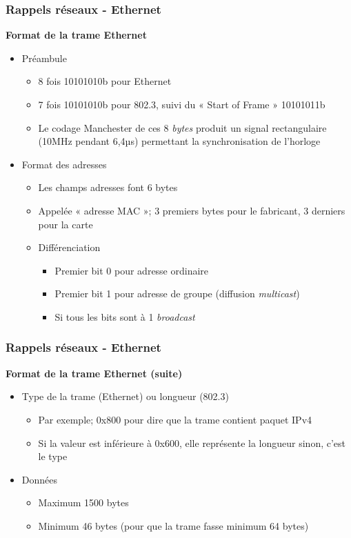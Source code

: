 \begin{frame}[fragile]
  \frametitle{Rappels réseaux - Ethernet}
{\large\bf Format de la trame Ethernet}
\begin{itemize}
	\item Préambule
	\begin{itemize}
		\item 8 fois 10101010b pour Ethernet
		\item 7 fois 10101010b pour 802.3, suivi du « Start of Frame » 10101011b
		\item Le codage Manchester de ces 8 \textit{bytes} produit un signal
		rectangulaire (10MHz pendant 6,4µs) permettant la synchronisation de l'horloge
	\end{itemize}
	\item Format des adresses
	\begin{itemize}
		\item Les champs adresses font 6 bytes
		\item Appelée « adresse MAC »; 3 premiers bytes pour le fabricant, 3 derniers pour la carte
		\item Différenciation
		\begin{itemize}
			\item Premier bit 0 pour adresse ordinaire
			\item Premier bit 1 pour adresse de groupe (diffusion \textit{multicast})
			\item Si tous les bits sont à 1 \textit{broadcast}
		\end{itemize}
	\end{itemize}
\end{itemize}
\end{frame}

\begin{frame}[fragile]
  \frametitle{Rappels réseaux - Ethernet}
{\large\bf Format de la trame Ethernet (suite)}
\begin{itemize}
	\item Type de la trame (Ethernet) ou longueur (802.3)
	\begin{itemize}
		\item Par exemple; 0x800 pour dire que la trame contient paquet IPv4
		\item Si la valeur est inférieure à 0x600, elle représente la longueur sinon, c'est le type
	\end{itemize}
	\item Données
	\begin{itemize}
		\item Maximum 1500 bytes
		\item Minimum 46 bytes (pour que la trame fasse minimum 64 bytes)
	\end{itemize}
\end{itemize}
\end{frame}

